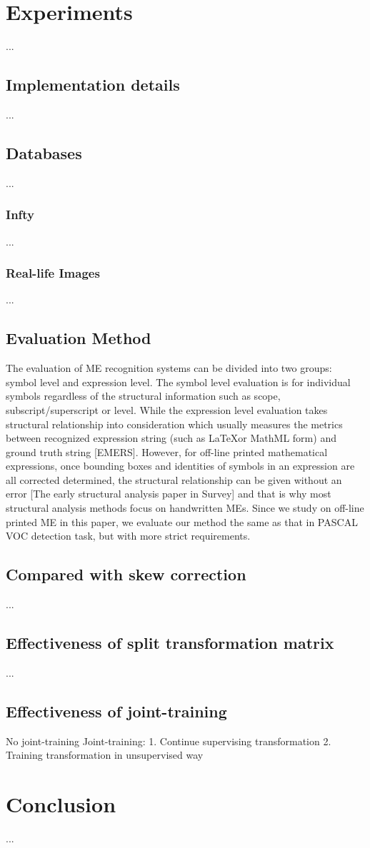 \documentclass[10pt,conference,a4paper]{IEEEtran}
\begin{document}
	\section{Experiments}
	...
	\subsection{Implementation details}
	...
	\subsection{Databases}
	...
	\subsubsection{Infty}
	...
	\subsubsection{Real-life Images}
	...
	\subsection{Evaluation Method}
	The evaluation of ME recognition systems can be divided into two groups: symbol level and expression level. The symbol level evaluation is for individual symbols regardless of the structural information such as scope, subscript/superscript or level. While the expression level evaluation takes structural relationship into consideration which usually measures the metrics between recognized expression string (such as \LaTeX or MathML form) and ground truth string [EMERS]. However, for off-line printed mathematical expressions, once bounding boxes and identities of symbols in an expression are all corrected determined, the structural relationship can be given without an error [The early structural analysis paper in Survey] and that is why most structural analysis methods focus on handwritten MEs. %
	Since we study on off-line printed ME in this paper, we evaluate our method the same as that in PASCAL VOC detection task, but with more strict requirements.
	\subsection{Compared with skew correction}
	...
	\subsection{Effectiveness of split transformation matrix}
	...
	\subsection{Effectiveness of joint-training}
	No joint-training
	Joint-training:
	1. Continue supervising transformation
	2. Training transformation in unsupervised way
	
	
	
	\section{Conclusion}
	...
	
\end{document}
